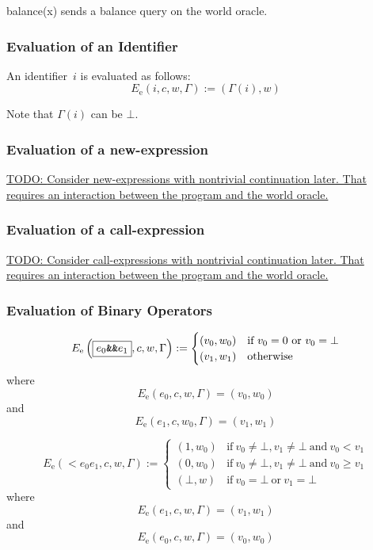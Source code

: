 \documentclass{book}
\newcommand{\todo}[1]{\underline{TODO: {#1}}}
\newcommand{\evalE}[1]{E_\mathrm{e}\left({#1}\right)}
\begin{document}
balance(x) sends a balance query on the world oracle.

\subsubsection{Evaluation of an Identifier}

An identifier~$i$ is evaluated as follows:
\[
\evalE{\boxed{i}, c, w, \Gamma} := (\Gamma(i), w)
\]

Note that $\Gamma(i)$ can be $\bot$.

\subsubsection{Evaluation of a new-expression}

\todo{Consider new-expressions with nontrivial continuation later.  That requires an interaction between the program and the world oracle. }

\subsubsection{Evaluation of a call-expression}

\todo{Consider call-expressions with nontrivial continuation later.  That requires an interaction between the program and the world oracle. }

\subsubsection{Evaluation of Binary Operators}

\[
\evalE{\boxed{\logicalAnd{e_0}{e_1}}, c, w, \Gamma} :=
\begin{cases}
  (v_0, w_0) & \text{if}\ v_0 = 0\ \text{or}\ v_0 = \bot \\
  (v_1, w_1) & \text{otherwise}
\end{cases}
\]
where
\[
\evalE{\boxed{e_0}, c, w, \Gamma} = (v_0, w_0)
\]
and
\[
\evalE{\boxed{e_1}, c, w_0, \Gamma} = (v_1, w_1)
\]

\[
\evalE{\boxed{\lt{e_0}{e_1}}, c, w, \Gamma} :=
\begin{cases}
  (1, w_0) &\text{if}\ v_0 \neq \bot, v_1 \neq\bot\ \text{and}\ v_0 < v_1 \\
  (0, w_0) &\text{if}\ v_0 \neq \bot, v_1 \neq\bot\ \text{and}\ v_0 \ge v_1 \\
  (\bot, w) &\text{if}\ v_0 = \bot \ \text{or}\ v_1 = \bot
\end{cases}
\]
where
\[
\evalE{\boxed{e_1}, c, w, \Gamma} = (v_1, w_1)
\]
and
\[
\evalE{\boxed{e_0}, c, w, \Gamma} = (v_0, w_0)
\]
\end{document}
